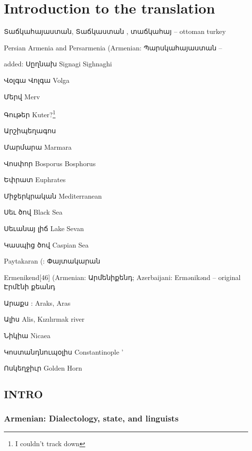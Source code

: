 \part{Introduction to the translation}





Տաճկահայաստան, Տաճկաստան , տաճկահայ -- ottoman turkey

Persian Armenia and Persarmenia (Armenian: Պարսկահայաստան –

added: Սըղնախ Signagi Sighnaghi

Վօլգա Վոլգա Volga

Մերվ Merv

Գութեր Kuter?\footnote{I couldn't track down}

Արշիպեղագոս

Մարմարա Marmara

Վոսփոր Bosporus Bosphorus

Եփրատ Euphrates

Միջերկրական Mediterranean

Սեւ ծով Black Sea

Սեւանայ լիճ Lake Sevan

Կասպից ծով Caspian Sea

Paytakaran (: Փայտակարան


Ermenikend[46] (Armenian: Արմենիքենդ; Azerbaijani: Ermənikənd -- original Էրմէնի քեանդ 

Արաքս : Araks, Aras

Ալիս  Alis, Kızılırmak river

  Նիկիա  Nicaea

  Կոստանդնուպօլիս Constantinople
'


Ոսկեղջիւր Golden Horn



\chapter{INTRO}

\section{Armenian: Dialectology, state, and linguists}
